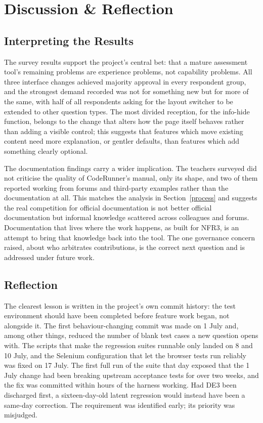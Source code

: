 \section{Discussion \& Reflection}

\subsection{Interpreting the Results}

The survey results support the project's central bet: that a mature assessment tool's remaining problems are experience problems, not capability problems. All three interface changes achieved majority approval in every respondent group, and the strongest demand recorded was not for something new but for more of the same, with half of all respondents asking for the layout switcher to be extended to other question types. The most divided reception, for the info-hide function, belongs to the change that alters how the page itself behaves rather than adding a visible control; this suggests that features which move existing content need more explanation, or gentler defaults, than features which add something clearly optional.

The documentation findings carry a wider implication. The teachers surveyed did not criticise the quality of CodeRunner's manual, only its shape, and two of them reported working from forums and third-party examples rather than the documentation at all. This matches the analysis in Section~\ref{process} and suggests the real competition for official documentation is not better official documentation but informal knowledge scattered across colleagues and forums. Documentation that lives where the work happens, as built for NFR3, is an attempt to bring that knowledge back into the tool. The one governance concern raised, about who arbitrates contributions, is the correct next question and is addressed under future work.

\subsection{Reflection}

The clearest lesson is written in the project's own commit history: the test environment should have been completed before feature work began, not alongside it. The first behaviour-changing commit was made on 1 July and, among other things, reduced the number of blank test cases a new question opens with. The scripts that make the regression suites runnable only landed on 8 and 10 July, and the Selenium configuration that let the browser tests run reliably was fixed on 17 July. The first full run of the suite that day exposed that the 1 July change had been breaking upstream acceptance tests for over two weeks, and the fix was committed within hours of the harness working. Had DE3 been discharged first, a sixteen-day-old latent regression would instead have been a same-day correction. The requirement was identified early; its priority was misjudged.

